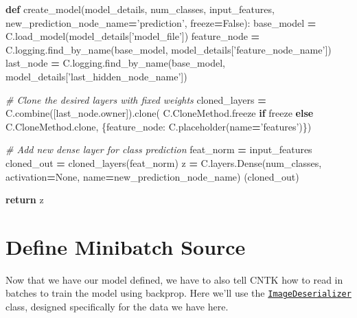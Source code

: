 \documentclass[]{book}
\newenvironment{Shaded}{\begin{snugshade}}{\end{snugshade}}
\newcommand{\KeywordTok}[1]{\textcolor[rgb]{0.13,0.29,0.53}{\textbf{#1}}}
\newcommand{\StringTok}[1]{\textcolor[rgb]{0.31,0.60,0.02}{#1}}
\newcommand{\CommentTok}[1]{\textcolor[rgb]{0.56,0.35,0.01}{\textit{#1}}}
\newcommand{\VariableTok}[1]{\textcolor[rgb]{0.00,0.00,0.00}{#1}}
\newcommand{\ControlFlowTok}[1]{\textcolor[rgb]{0.13,0.29,0.53}{\textbf{#1}}}
\newcommand{\OperatorTok}[1]{\textcolor[rgb]{0.81,0.36,0.00}{\textbf{#1}}}
\newcommand{\NormalTok}[1]{#1}
\theoremstyle{definition}
\theoremstyle{definition}
\theoremstyle{definition}
\theoremstyle{remark}
\begin{document}
\begin{Shaded}
\begin{Highlighting}[]
\KeywordTok{def}\NormalTok{ create_model(model_details, num_classes, input_features, }
\NormalTok{                 new_prediction_node_name}\OperatorTok{=}\StringTok{'prediction'}\NormalTok{, freeze}\OperatorTok{=}\VariableTok{False}\NormalTok{):}
\NormalTok{    base_model }\OperatorTok{=}\NormalTok{ C.load_model(model_details[}\StringTok{'model_file'}\NormalTok{])}
\NormalTok{    feature_node }\OperatorTok{=}\NormalTok{ C.logging.find_by_name(base_model, model_details[}\StringTok{'feature_node_name'}\NormalTok{])}
\NormalTok{    last_node }\OperatorTok{=}\NormalTok{ C.logging.find_by_name(base_model, model_details[}\StringTok{'last_hidden_node_name'}\NormalTok{])}

    \CommentTok{# Clone the desired layers with fixed weights}
\NormalTok{    cloned_layers }\OperatorTok{=}\NormalTok{ C.combine([last_node.owner]).clone(}
\NormalTok{        C.CloneMethod.freeze }\ControlFlowTok{if}\NormalTok{ freeze }\ControlFlowTok{else}\NormalTok{ C.CloneMethod.clone,}
\NormalTok{        \{feature_node: C.placeholder(name}\OperatorTok{=}\StringTok{'features'}\NormalTok{)\})}

    \CommentTok{# Add new dense layer for class prediction}
\NormalTok{    feat_norm }\OperatorTok{=}\NormalTok{ input_features}
\NormalTok{    cloned_out }\OperatorTok{=}\NormalTok{ cloned_layers(feat_norm)}
\NormalTok{    z }\OperatorTok{=}\NormalTok{ C.layers.Dense(num_classes, activation}\OperatorTok{=}\VariableTok{None}\NormalTok{, name}\OperatorTok{=}\NormalTok{new_prediction_node_name) (cloned_out)}

    \ControlFlowTok{return}\NormalTok{ z}
\end{Highlighting}
\end{Shaded}

\section{Define Minibatch Source}\label{define-minibatch-source}

Now that we have our model defined, we have to also tell CNTK how to
read in batches to train the model using backprop. Here we'll use the
\href{https://cntk.ai/pythondocs/cntk.io.html\#cntk.io.ImageDeserializer}{\texttt{ImageDeserializer}}
class, designed specifically for the data we have here.
\end{document}
